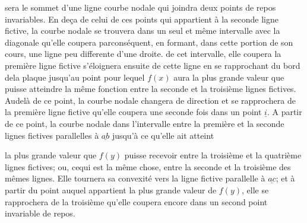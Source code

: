 \documentclass[11pt,a4paper]{article}
\begin{document}
sera le sommet d'une ligne courbe nodale qui joindra deux
points de repos invariables.  En deça de celui de ces points
qui appartient à la seconde ligne fictive, la courbe nodale
se trouvera dans un seul et même intervalle avec la diagonale
qu'elle coupera parconséquent, en formant, 
 dans cette portion de son cours, une ligne peu
differente d'une droite.   de
cet intervalle, elle coupera la première ligne fictive   s'éloignera
ensuite de cette ligne en se rapprochant du bord dela plaque
jusqu'au point pour lequel $f(x)$ aura la plus grande valeur
que puisse atteindre la même fonction entre la seconde et
la troisième lignes fictives. Audelà de ce point, la courbe nodale
changera de direction et se rapprochera de la première
ligne fictive qu'elle coupera une seconde fois dans un
point $\underline{i}$. A partir de ce point, la courbe nodale 
dans l'intervalle entre la première et la seconde lignes
fictives parallelles à $\underline{ab}$ jusqu'à ce qu'elle ait atteint


la plus grande valeur que $f(y)$ puisse recevoir entre la troisième
et la quatrième lignes fictives; ou, cequi est la même chose,
entre la seconde et la troisième des mêmes lignes. Elle tournera
sa convexité vers la  ligne fictive parallelle à $\underline{ac}$; et à partir du point
auquel appartient la plus grande valeur de $f(y)$, elle se rapprochera de
la troisième qu'elle coupera encore dans un second point invariable de repos.
\end{document}
